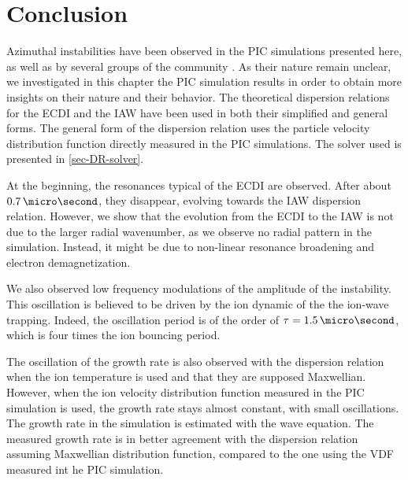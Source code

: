 
\section{Conclusion}
  Azimuthal instabilities have been observed in the \ac{PIC} simulations presented here, as well as by several groups of the community \citep{hara2019a,janhunen2018,taccogna2019}.
  As their nature remain unclear, we investigated in this chapter the \ac{PIC} simulation results in order to obtain more insights on their nature and their behavior.
  The theoretical dispersion relations for the \ac{ECDI} and the \ac{IAW} have been used in both their simplified and general forms.
  The general form of the dispersion relation uses the particle velocity distribution function directly measured in the \ac{PIC} simulations.
  The solver used is presented in \cref{sec-DR-solver}.
  
  At the beginning, the resonances typical of the \ac{ECDI} are observed.
  After about $0.7\,\micro\second$, they disappear, evolving towards the \ac{IAW} dispersion relation.
  However, we show that the evolution from the \ac{ECDI} to the \ac{IAW}  is not due to the larger radial wavenumber, as we observe no radial pattern in the simulation.
  Instead, it might be due to non-linear resonance broadening and electron demagnetization.
  
  \vspace{1ex}
  We also observed low frequency modulations of the amplitude of the instability.
  This oscillation is believed to be driven by the ion dynamic of the the ion-wave trapping.
  Indeed, the oscillation period is of the order of $\tau=1.5\,\micro\second$, which is four times the ion bouncing period.
  
  The oscillation of the growth rate is also observed with the dispersion relation when the ion temperature is used and that they are supposed Maxwellian.
  However, when the ion velocity distribution function measured in the \ac{PIC}  simulation is used, the growth rate stays almost constant, with small oscillations.
  The growth rate in the simulation is estimated with the wave equation.
  The measured growth rate is in better agreement with the dispersion relation assuming Maxwellian distribution function, compared to the one using the VDF measured int he PIC simulation.
  

